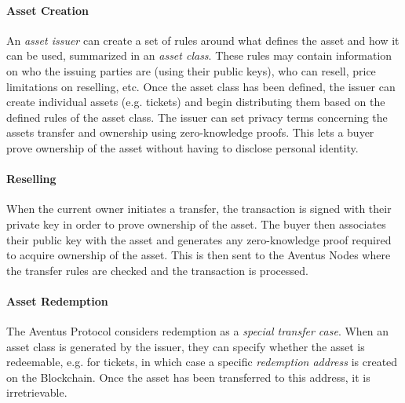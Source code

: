 \paragraph{Asset Creation}

An \textit{asset issuer} can create a set of rules around what defines the asset and how it can be used, summarized in an \textit{asset class}. These rules may contain information on who the issuing parties are (using their public keys), who can resell, price limitations on reselling, etc. Once the asset class has been defined, the issuer can create individual assets (e.g. tickets) and begin distributing them based on the defined rules of the asset class. The issuer can set privacy terms concerning the assets transfer and ownership using zero-knowledge proofs. This lets a buyer prove ownership of the asset without having to disclose personal identity.

\paragraph{Reselling}

When the current owner initiates a transfer, the transaction is signed with their private key in order to prove ownership of the asset. The buyer then associates their public key with the asset and generates any zero-knowledge proof required to acquire ownership of the asset. This is then sent to the Aventus Nodes where the transfer rules are checked and the transaction is processed.

\paragraph{Asset Redemption}

The Aventus Protocol considers redemption as a \textit{special transfer case}. When an asset class is generated by the issuer, they can specify whether the asset is redeemable, e.g. for tickets, in which case a specific \textit{redemption address} is created on the Blockchain. Once the asset has been transferred to this address, it is irretrievable.

